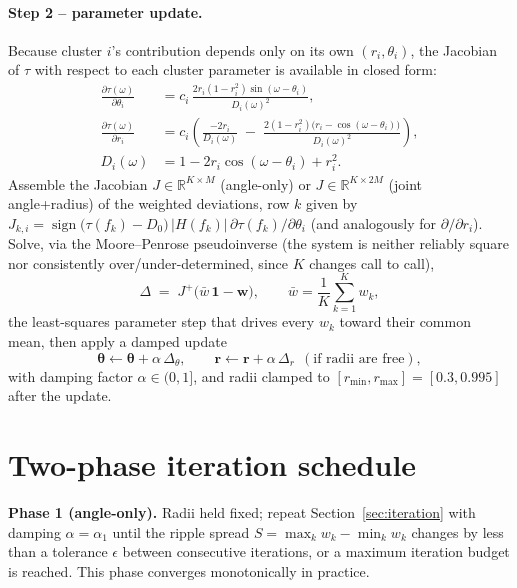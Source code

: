 \documentclass[11pt]{article}
\begin{document}
\paragraph{Step 2 -- parameter update.} Because cluster $i$'s
contribution depends only on its own $(r_i,\theta_i)$, the Jacobian of
$\tau$ with respect to each cluster parameter is available in closed
form:
\begin{align}
\frac{\partial \tau(\omega)}{\partial \theta_i} &= c_i\,\frac{2 r_i (1-r_i^2)\sin(\omega-\theta_i)}{D_i(\omega)^2}, \label{eq:jactheta}\\[4pt]
\frac{\partial \tau(\omega)}{\partial r_i} &= c_i\left(\frac{-2 r_i}{D_i(\omega)} \;-\; \frac{2(1-r_i^2)\big(r_i - \cos(\omega-\theta_i)\big)}{D_i(\omega)^2}\right), \label{eq:jacr}\\[4pt]
D_i(\omega) &= 1 - 2 r_i \cos(\omega-\theta_i) + r_i^2. \label{eq:Di}
\end{align}
Assemble the Jacobian $J \in \mathbb{R}^{K \times M}$ (angle-only) or
$J \in \mathbb{R}^{K \times 2M}$ (joint angle+radius) of the weighted
deviations, row $k$ given by
$J_{k,i} = \operatorname{sign}\big(\tau(f_k)-D_0\big)\,|H(f_k)|\,\partial\tau(f_k)/\partial\theta_i$
(and analogously for $\partial/\partial r_i$). Solve, via the
Moore--Penrose pseudoinverse (the system is neither reliably square nor
consistently over/under-determined, since $K$ changes call to call),
\begin{equation}
\Delta \;=\; J^{+}\big(\bar w \,\mathbf 1 - \mathbf w\big), \qquad \bar w = \frac1K \sum_{k=1}^K w_k,
\label{eq:lstsq}
\end{equation}
the least-squares parameter step that drives every $w_k$ toward their
common mean, then apply a damped update
\begin{equation}
\boldsymbol\theta \leftarrow \boldsymbol\theta + \alpha\, \Delta_\theta, \qquad
\mathbf r \leftarrow \mathbf r + \alpha\, \Delta_r \ \ (\text{if radii are free}),
\label{eq:damped}
\end{equation}
with damping factor $\alpha \in (0,1]$, and radii clamped to
$[r_{\min}, r_{\max}] = [0.3, 0.995]$ after the update.

\section{Two-phase iteration schedule}

\textbf{Phase 1 (angle-only).} Radii held fixed; repeat
Section~\ref{sec:iteration} with damping $\alpha = \alpha_1$ until the
ripple spread $S = \max_k w_k - \min_k w_k$ changes by less than a
tolerance $\epsilon$ between consecutive iterations, or a maximum
iteration budget is reached. This phase converges monotonically in
practice.
\end{document}
